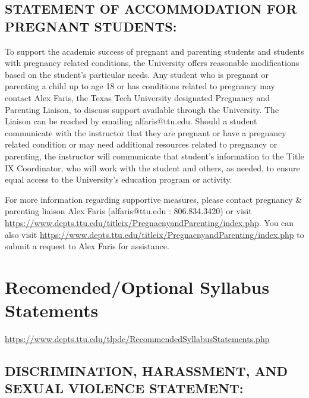 \documentclass[12pt]{article}
\begin{document}
\subsection*{STATEMENT OF ACCOMMODATION FOR PREGNANT STUDENTS:}
To support the academic success of pregnant and parenting students and students with pregnancy related conditions, the University offers reasonable modifications based on the student's particular needs. Any student who is pregnant or parenting a child up to age 18 or has conditions related to pregnancy may contact Alex Faris, the Texas Tech University designated Pregnancy and Parenting Liaison, to discuss support available through the University. The Liaison can be reached by emailing alfaris@ttu.edu. Should a student communicate with the instructor that they are pregnant or have a pregnancy related condition or may need additional resources related to pregnancy or parenting, the instructor will communicate that student's information to the Title IX Coordinator, who will work with the student and others, as needed, to ensure equal access to the University's education program or activity. 

For more information regarding supportive measures, please contact pregnancy \& parenting liaison Alex Faris (alfaris@ttu.edu : 806.834.3420) or visit \url{https://www.depts.ttu.edu/titleix/PregnacnyandParenting/index.php}. 
You can also visit \url{https://www.depts.ttu.edu/titleix/PregnacnyandParenting/index.php} to submit a request to Alex Faris for assistance.

\section*{Recomended/Optional Syllabus Statements}
\url{https://www.depts.ttu.edu/tlpdc/RecommendedSyllabusStatements.php}

\subsection*{DISCRIMINATION, HARASSMENT, AND SEXUAL VIOLENCE STATEMENT:}
\end{document}
